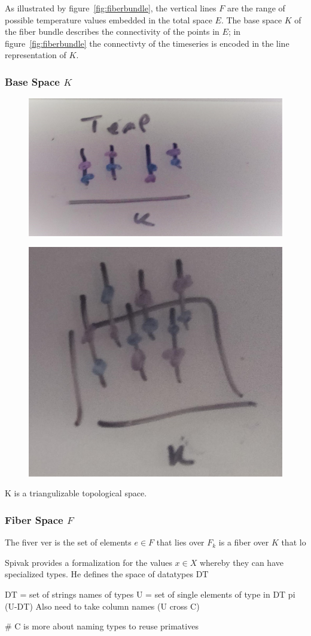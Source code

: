 \documentclass[../main.tex]{subfiles}
\begin{document}
As illustrated by figure~\ref{fig:fiberbundle}, the vertical lines $F$ are the range of possible temperature values embedded in the total space $E$. The base space $K$ of the fiber bundle describes the connectivity of the points in $E$; in figure~\ref{fig:fiberbundle} the connectivty of the timeseries is encoded in the line representation of $K$. 

\subsubsection{Base Space $K$}
\begin{figure}[ht]
    \includegraphics[width=0.2\linewidth]{figures/sections/math/temp_1k.png}
\end{figure}
\begin{figure}[ht]
    \includegraphics[width=0.2\linewidth]{figures/sections/math/temp_2k.png}
\end{figure}

K is a triangulizable topological space. 


\subsubsection{Fiber Space $F$}
The fiver ver is the set of elements $e \in F$ that lies over 
$F_{k}$ is a fiber over $K$ that lo 

Spivak provides a formalization for the values $x \in X$ whereby they can have specialized types. He defines the space of datatypes $\mathrm{DT}$ 

DT = set of strings names of types
U = set of single elements of type in DT
pi (U-DT)
Also need to take column names (U cross C) 

# C is more about naming types to reuse primatives 
\end{document}
